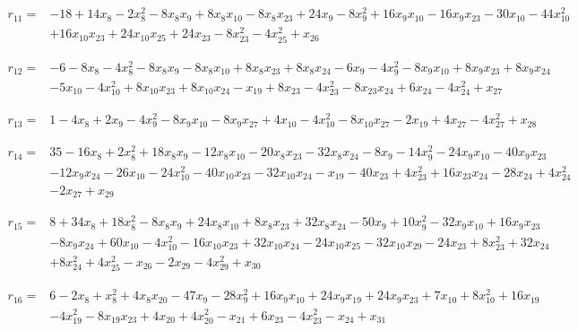 \begin{align*}
r_{11}={}&-18+14x_{8}-2x_{8}^{2}-8x_{8}x_{9}+8x_{8}x_{10}-8x_{8}x_{23}+24x_{9}-8x_{9}^{2}+16x_{9}x_{10}-16x_{9}x_{23}-30x_{10}-44x_{10}^{2}\\
&+16x_{10}x_{23}+24x_{10}x_{25}+24x_{23}-8x_{23}^{2}-4x_{25}^{2}+x_{26}
\end{align*}

\begin{align*}
r_{12}={}&-6-8x_{8}-4x_{8}^{2}-8x_{8}x_{9}-8x_{8}x_{10}+8x_{8}x_{23}+8x_{8}x_{24}-6x_{9}-4x_{9}^{2}-8x_{9}x_{10}+8x_{9}x_{23}+8x_{9}x_{24}\\
&-5x_{10}-4x_{10}^{2}+8x_{10}x_{23}+8x_{10}x_{24}-x_{19}+8x_{23}-4x_{23}^{2}-8x_{23}x_{24}+6x_{24}-4x_{24}^{2}+x_{27}
\end{align*}

\begin{align*}
r_{13}={}&1-4x_{8}+2x_{9}-4x_{9}^{2}-8x_{9}x_{10}-8x_{9}x_{27}+4x_{10}-4x_{10}^{2}-8x_{10}x_{27}-2x_{19}+4x_{27}-4x_{27}^{2}+x_{28}
\end{align*}

\begin{align*}
r_{14}={}&35-16x_{8}+2x_{8}^{2}+18x_{8}x_{9}-12x_{8}x_{10}-20x_{8}x_{23}-32x_{8}x_{24}-8x_{9}-14x_{9}^{2}-24x_{9}x_{10}-40x_{9}x_{23}\\
&-12x_{9}x_{24}-26x_{10}-24x_{10}^{2}-40x_{10}x_{23}-32x_{10}x_{24}-x_{19}-40x_{23}+4x_{23}^{2}+16x_{23}x_{24}-28x_{24}+4x_{24}^{2}\\
&-2x_{27}+x_{29}
\end{align*}

\begin{align*}
r_{15}={}&8+34x_{8}+18x_{8}^{2}-8x_{8}x_{9}+24x_{8}x_{10}+8x_{8}x_{23}+32x_{8}x_{24}-50x_{9}+10x_{9}^{2}-32x_{9}x_{10}+16x_{9}x_{23}\\
&-8x_{9}x_{24}+60x_{10}-4x_{10}^{2}-16x_{10}x_{23}+32x_{10}x_{24}-24x_{10}x_{25}-32x_{10}x_{29}-24x_{23}+8x_{23}^{2}+32x_{24}\\
&+8x_{24}^{2}+4x_{25}^{2}-x_{26}-2x_{29}-4x_{29}^{2}+x_{30}
\end{align*}

\begin{align*}
r_{16}={}&6-2x_{8}+x_{8}^{2}+4x_{8}x_{20}-47x_{9}-28x_{9}^{2}+16x_{9}x_{10}+24x_{9}x_{19}+24x_{9}x_{23}+7x_{10}+8x_{10}^{2}+16x_{19}\\
&-4x_{19}^{2}-8x_{19}x_{23}+4x_{20}+4x_{20}^{2}-x_{21}+6x_{23}-4x_{23}^{2}-x_{24}+x_{31}
\end{align*}

